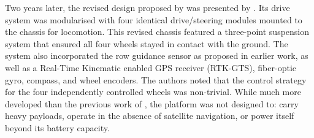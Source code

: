 \documentclass[preprint,authoryear,12pt]{elsarticle}
\begin{document}

        Two years later, the revised design proposed by \cite{Pedersen2002} was presented by \cite{Bak2004}.
        Its drive system was modularised with four identical drive/steering modules mounted to the chassis for locomotion.
        This revised chassis featured a three-point suspension system that ensured all four wheels stayed in contact with the ground.
        The system also incorporated the row guidance sensor as proposed in earlier work, as well as a Real-Time Kinematic enabled GPS receiver (RTK-GTS), fiber-optic gyro, compass, and wheel encoders.
        The authors noted that the control strategy for the four independently controlled wheels was non-trivial.
        While much more developed than the previous work of \cite{Pedersen2002}, the platform was not designed to: carry heavy payloads, operate in the absence of satellite navigation, or power itself beyond its battery capacity.
\end{document}
